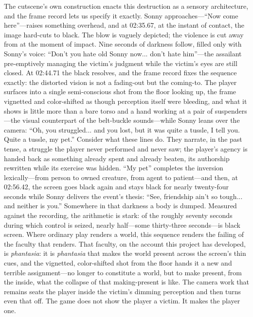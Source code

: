 \documentclass{article}
\begin{document}
The cutscene's own construction enacts this destruction as a sensory architecture, and the frame record lets us specify it exactly. Sonny approaches---``Now come here''---raises something overhead, and at 02:35.67, at the instant of contact, the image hard-cuts to black. The blow is vaguely depicted; the violence is cut away from at the moment of impact. Nine seconds of darkness follow, filled only with Sonny's voice: ``Don't you hate old Sonny now... don't hate him''---the assailant pre-emptively managing the victim's judgment while the victim's eyes are still closed. At 02:44.71 the black resolves, and the frame record fixes the sequence exactly: the distorted vision is not a fading-out but the coming-to. The player surfaces into a single semi-conscious shot from the floor looking up, the frame vignetted and color-shifted as though perception itself were bleeding, and what it shows is little more than a bare torso and a hand working at a pair of suspenders---the visual counterpart of the belt-buckle sounds---while Sonny leans over the camera: ``Oh, you struggled... and you lost, but it was quite a tussle, I tell you. Quite a tussle, my pet.'' Consider what these lines do. They narrate, in the past tense, a struggle the player never performed and never saw; the player's agency is handed back as something already spent and already beaten, its authorship rewritten while its exercise was hidden. ``My pet'' completes the inversion lexically---from person to owned creature, from agent to patient---and then, at 02:56.42, the screen goes black again and stays black for nearly twenty-four seconds while Sonny delivers the event's thesis: ``See, friendship ain't so tough... and neither is you.'' Somewhere in that darkness a body is dumped. Measured against the recording, the arithmetic is stark: of the roughly seventy seconds during which control is seized, nearly half---some thirty-three seconds---is black screen. Where ordinary play renders a world, this sequence renders the failing of the faculty that renders. That faculty, on the account this project has developed, is \textit{phantasia}: it is \textit{phantasia} that makes the world present across the screen's thin cues, and the vignetted, color-shifted shot from the floor hands it a new and terrible assignment---no longer to constitute a world, but to make present, from the inside, what the collapse of that making-present is like. The camera work that remains seats the player inside the victim's dimming perception and then turns even that off. The game does not show the player a victim. It makes the player one.
\end{document}
